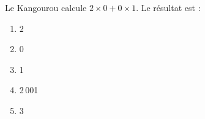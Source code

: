 Le Kangourou calcule $2\times0+0\times1$. Le résultat est :
\begin{multicols}{5}
\begin{enumerate}[A/]
\item 2
\item 0
\item 1
\item 2\,001
\item 3
\end{enumerate}  
\end{multicols}
